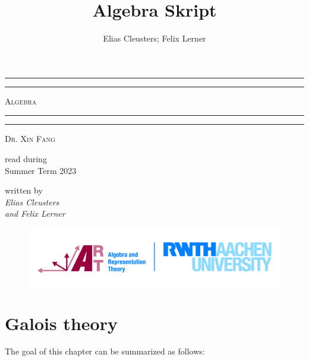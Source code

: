 \documentclass[twoside = false,	%
		headsepline,		%
		parskip = true,
		]{scrbook}						%
\title{Algebra Skript}
\author{Elias Cleusters; Felix Lerner}
\begin{document}
\thispagestyle{plain}
\begin{titlepage}
	\centering
	
    {\rule{15cm}{3pt}\par}
    \vspace*{-5.5mm}
    {\rule{15cm}{1pt} \par}
    
	{\scshape\Huge Algebra \par}
	
    \vspace*{-2.5mm}
    {\rule{15cm}{1pt}\par}
    \vspace*{-4.8mm}
    {\rule{15cm}{3pt}\par}
    
	\vspace{2cm}
	
	{\scshape\Large Dr. Xin Fang \par}
	
	\vspace{1.5cm}
	
	{\Large read during \\
    Summer Term 2023 \par}
    
    \vspace{3cm}
    {\Large written by \\
    \itshape Elias Cleusters \\
    and Felix Lerner}
    
	\vfill
	
	\begin{figure}[ht]
        \centering
        \includegraphics[scale=0.27]{img/rwth_art_en_cmyk.jpg}
    \end{figure}
\end{titlepage}
\clearpage

\setcounter{page}{1}                           %
\tableofcontents                               %
\chapter{Galois theory}
    The goal of this chapter can be summarized as follows:
    
\end{document}
